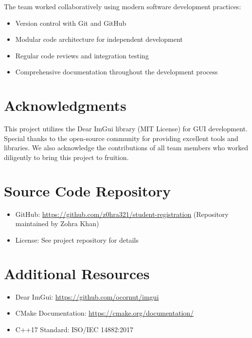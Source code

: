 \documentclass[12pt,a4paper]{article}
\begin{document}
The team worked collaboratively using modern software development practices:
\begin{itemize}
    \item Version control with Git and GitHub
    \item Modular code architecture for independent development
    \item Regular code reviews and integration testing
    \item Comprehensive documentation throughout the development process
\end{itemize}

\section{Acknowledgments}

This project utilizes the Dear ImGui library (MIT License) for GUI development. Special thanks to the open-source community for providing excellent tools and libraries. We also acknowledge the contributions of all team members who worked diligently to bring this project to fruition.

\newpage

\appendix

\section{Source Code Repository}
\begin{itemize}
    \item GitHub: \url{https://github.com/z0hra321/student-registration} (Repository maintained by Zohra Khan)
    \item License: See project repository for details
\end{itemize}

\section{Additional Resources}
\begin{itemize}
    \item Dear ImGui: \url{https://github.com/ocornut/imgui}
    \item CMake Documentation: \url{https://cmake.org/documentation/}
    \item C++17 Standard: ISO/IEC 14882:2017
\end{itemize}
\end{document}
